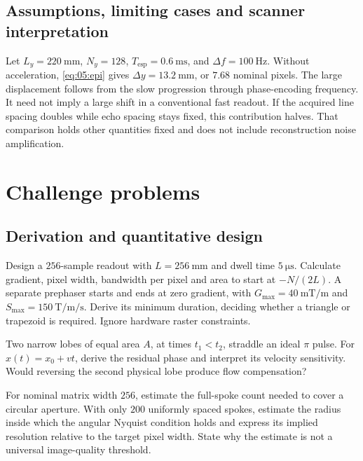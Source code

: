 \subsection{Assumptions, limiting cases and scanner interpretation}
\begin{workedexample}
Let \(L_y=\SI{220}{\milli\metre}\), \(N_y=128\), \(T_{\mathrm{esp}}=\SI{0.6}{\milli\second}\), and \(\Delta f=\SI{100}{\hertz}\).
Without acceleration, \cref{eq:05:epi} gives \(\Delta y=\SI{13.2}{\milli\metre}\), or \(7.68\) nominal pixels.
The large displacement follows from the slow progression through phase-encoding frequency. It need not imply a large shift in a conventional fast readout.
If the acquired line spacing doubles while echo spacing stays fixed, this contribution halves. That comparison holds other quantities fixed and does not include reconstruction noise amplification.
\end{workedexample}

\section{Challenge problems}
\label{sec:05:challenge-problems}
\subsection{Derivation and quantitative design}
\begin{challengeproblem}\label{prob:05:readout}
Design a \(256\)-sample readout with \(L=\SI{256}{\milli\metre}\) and dwell time \(\SI{5}{\micro\second}\).
Calculate gradient, pixel width, bandwidth per pixel and area to start at \(-N/(2L)\).
A separate prephaser starts and ends at zero gradient, with \(G_{\max}=\SI{40}{\milli\tesla\per\metre}\) and \(S_{\max}=\SI{150}{\tesla\per\metre\per\second}\).
Derive its minimum duration, deciding whether a triangle or trapezoid is required. Ignore hardware raster constraints.
\end{challengeproblem}
\begin{challengeproblem}\label{prob:05:balance}
Two narrow lobes of equal area \(A\), at times \(t_1<t_2\), straddle an ideal \(\pi\) pulse.
For \(x(t)=x_0+vt\), derive the residual phase and interpret its velocity sensitivity.
Would reversing the second physical lobe produce flow compensation?
\end{challengeproblem}
\begin{challengeproblem}\label{prob:05:radial}
For nominal matrix width \(256\), estimate the full-spoke count needed to cover a circular aperture.
With only \(200\) uniformly spaced spokes, estimate the radius inside which the angular Nyquist condition holds and express its implied resolution relative to the target pixel width. State why the estimate is not a universal image-quality threshold.
\end{challengeproblem}
